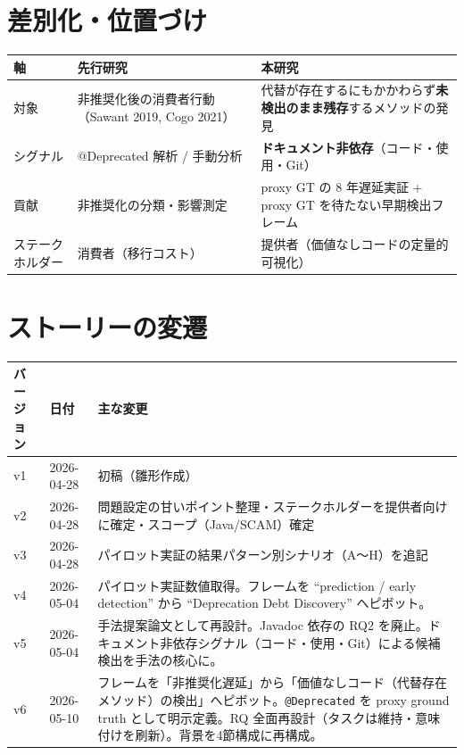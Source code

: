 \documentclass[a4paper,12pt]{article}
\begin{document}
\section{差別化・位置づけ}

\begin{tabular}{|p{2.5cm}|p{5.5cm}|p{5.5cm}|}
  \hline
  \textbf{軸} & \textbf{先行研究} & \textbf{本研究} \\
  \hline
  対象 & 非推奨化後の消費者行動（Sawant 2019, Cogo 2021） & 代替が存在するにもかかわらず\textbf{未検出のまま残存}するメソッドの発見 \\
  \hline
  シグナル & @Deprecated 解析 / 手動分析 & \textbf{ドキュメント非依存}（コード・使用・Git） \\
  \hline
  貢献 & 非推奨化の分類・影響測定 & proxy GT の 8 年遅延実証 + proxy GT を待たない早期検出フレーム \\
  \hline
  ステークホルダー & 消費者（移行コスト） & 提供者（価値なしコードの定量的可視化） \\
  \hline
\end{tabular}

\section{ストーリーの変遷}

\begin{tabular}{|p{2cm}|p{2.5cm}|p{9cm}|}
  \hline
  \textbf{バージョン} & \textbf{日付} & \textbf{主な変更} \\
  \hline
  v1 & 2026-04-28 & 初稿（雛形作成） \\
  \hline
  v2 & 2026-04-28 & 問題設定の甘いポイント整理・ステークホルダーを提供者向けに確定・スコープ（Java/SCAM）確定 \\
  \hline
  v3 & 2026-04-28 & パイロット実証の結果パターン別シナリオ（A〜H）を追記 \\
  \hline
  v4 & 2026-05-04 & パイロット実証数値取得。フレームを ``prediction / early detection'' から ``Deprecation Debt Discovery'' へピボット。 \\
  \hline
  v5 & 2026-05-04 & 手法提案論文として再設計。Javadoc 依存の RQ2 を廃止。ドキュメント非依存シグナル（コード・使用・Git）による候補検出を手法の核心に。 \\
  \hline
  v6 & 2026-05-10 & フレームを「非推奨化遅延」から「価値なしコード（代替存在メソッド）の検出」へピボット。\texttt{@Deprecated} を proxy ground truth として明示定義。RQ 全面再設計（タスクは維持・意味付けを刷新）。背景を4節構成に再構成。 \\
  \hline
\end{tabular}



\end{document}

